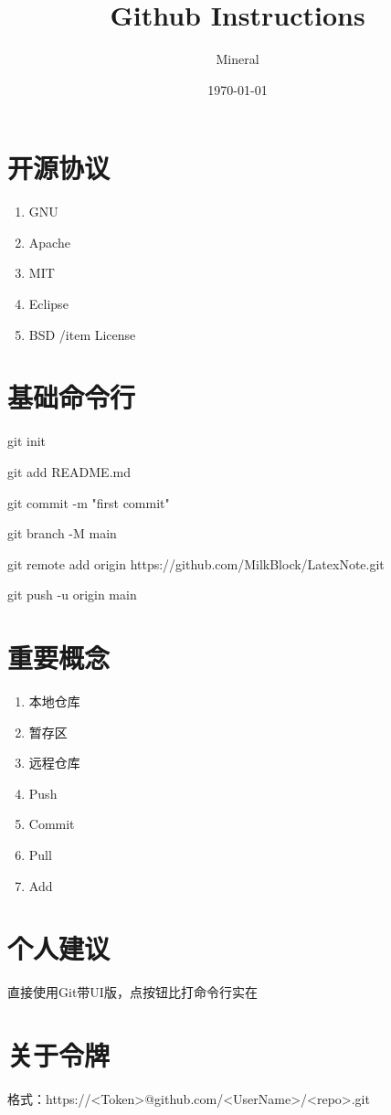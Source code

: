 \documentclass[utf8]{ctexart}
\author{Mineral}
\title{Github Instructions}
\date {\today}
\begin{document}
		\maketitle
	\section{开源协议}
    \begin{enumerate}
    		\item GNU
			\item Apache
			\item MIT
			\item Eclipse
			\item BSD
			/item License
    \end{enumerate}		
	\section{基础命令行}
	\par git init
	\par git add README.md
	\par git commit -m "first commit"
	\par git branch -M main
	\par git remote add origin https://github.com/MilkBlock/LatexNote.git
	\par git push -u origin main
	\section{重要概念}
	\begin{enumerate}
			\item 本地仓库
			\item 暂存区
			\item 远程仓库

		\item Push
	\item Commit
\item Pull\item Add
	\end{enumerate}
	\section{个人建议}
	\par 直接使用Git带UI版，点按钮比打命令行实在
	\section{关于令牌}
	\par 格式：https://<Token>@github.com/<UserName>/<repo>.git
	
\end{document}
